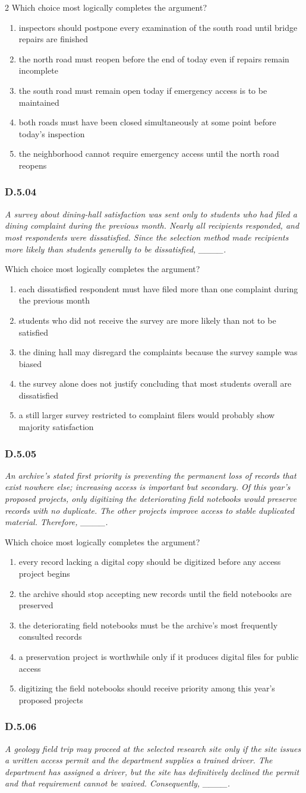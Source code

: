 \documentclass[10pt]{extarticle}
\newcommand{\choice}[1]{\item #1}
\newcommand{\bankitem}[1]{\subsubsection*{#1}}
\begin{document}
\begin{multicols}{2}
Which choice most logically completes the argument?
\begin{enumerate}[label=(\alph*)]
  \choice{inspectors should postpone every examination of the south road until bridge repairs are finished}
  \choice{the north road must reopen before the end of today even if repairs remain incomplete}
  \choice{the south road must remain open today if emergency access is to be maintained}
  \choice{both roads must have been closed simultaneously at some point before today's inspection}
  \choice{the neighborhood cannot require emergency access until the north road reopens}
\end{enumerate}
\bankitem{D.5.04}
\emph{A survey about dining-hall satisfaction was sent only to students who had filed a dining complaint during the previous month. Nearly all recipients responded, and most respondents were dissatisfied. Since the selection method made recipients more likely than students generally to be dissatisfied, \_\_\_\_.}

Which choice most logically completes the argument?
\begin{enumerate}[label=(\alph*)]
  \choice{each dissatisfied respondent must have filed more than one complaint during the previous month}
  \choice{students who did not receive the survey are more likely than not to be satisfied}
  \choice{the dining hall may disregard the complaints because the survey sample was biased}
  \choice{the survey alone does not justify concluding that most students overall are dissatisfied}
  \choice{a still larger survey restricted to complaint filers would probably show majority satisfaction}
\end{enumerate}
\bankitem{D.5.05}
\emph{An archive's stated first priority is preventing the permanent loss of records that exist nowhere else; increasing access is important but secondary. Of this year's proposed projects, only digitizing the deteriorating field notebooks would preserve records with no duplicate. The other projects improve access to stable duplicated material. Therefore, \_\_\_\_.}

Which choice most logically completes the argument?
\begin{enumerate}[label=(\alph*)]
  \choice{every record lacking a digital copy should be digitized before any access project begins}
  \choice{the archive should stop accepting new records until the field notebooks are preserved}
  \choice{the deteriorating field notebooks must be the archive's most frequently consulted records}
  \choice{a preservation project is worthwhile only if it produces digital files for public access}
  \choice{digitizing the field notebooks should receive priority among this year's proposed projects}
\end{enumerate}
\bankitem{D.5.06}
\emph{A geology field trip may proceed at the selected research site only if the site issues a written access permit and the department supplies a trained driver. The department has assigned a driver, but the site has definitively declined the permit and that requirement cannot be waived. Consequently, \_\_\_\_.}


\end{multicols}
\end{document}
